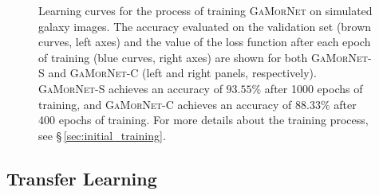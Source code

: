 \documentclass[twocolumn]{aastex63}
\newcommand\gamornet{G\textsc{a}M\textsc{or}N\textsc{et}}
\begin{document}
\begin{figure}[htb]
	\begin{center}
  \end{center}
  \caption{Learning curves for the process of training \gamornet{} on simulated galaxy images. The accuracy evaluated on the validation set (brown curves, left axes) and the value of the loss function after each epoch of training (blue curves, right axes) are shown for both \gamornet{}-S and \gamornet{}-C (left and right panels, respectively). \gamornet{}-S achieves an accuracy of $93.55\%$ after 1000 epochs of training, and \gamornet{}-C achieves an accuracy of $88.33\%$ after 400 epochs of training. For more details about the training process, see \S\,\ref{sec:initial_training}.}
  \label{fig:base_network_train}
\end{figure}

\subsection{Transfer Learning} \label{sec:tf_intro}
\end{document}
